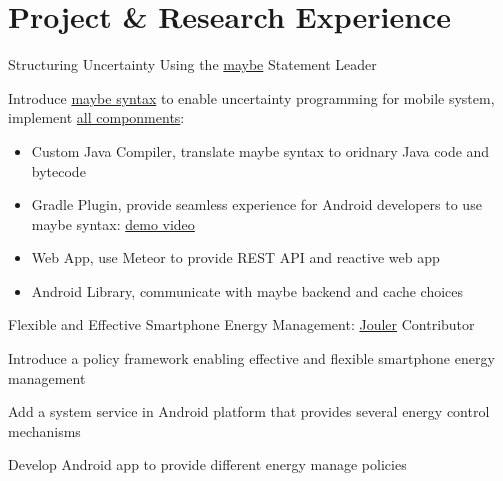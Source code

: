 
\section{Project \& Research Experience}



{Structuring Uncertainty Using the \href{http://blue.cse.buffalo.edu/projects/maybe}{maybe} Statement}
{Leader}
{}
{}
{
  \begin{tightitemize}
  \item Introduce \href{https://blue-systems-research-group.gitbooks.io/maybe/content/concepts.html}{maybe syntax} to enable uncertainty programming for mobile system,
implement \href{https://blue-systems-research-group.gitbooks.io/maybe/content/}{all componments}:
    \begin{itemize}
      \item Custom Java Compiler, translate maybe syntax to oridnary Java code and bytecode
      \item Gradle Plugin, provide seamless experience for Android developers to use maybe syntax: \href{https://www.youtube.com/watch?v=RYcQ7WVunmc}{demo video}
      \item Web App, use Meteor to provide REST API and reactive web app
      \item Android Library, communicate with maybe backend and cache choices
    \end{itemize}
  \end{tightitemize}
}

{Flexible and Effective Smartphone Energy Management: \href{http://blue.cse.buffalo.edu/projects/jouler/}{Jouler}}
{Contributor}
{}
{}
{
  \begin{tightitemize}
  \item Introduce a policy framework enabling effective and flexible smartphone energy management
  \item Add a system service in Android platform that provides several energy control mechanisms
  \item Develop Android app to provide different energy manage policies
  \end{tightitemize}
}

